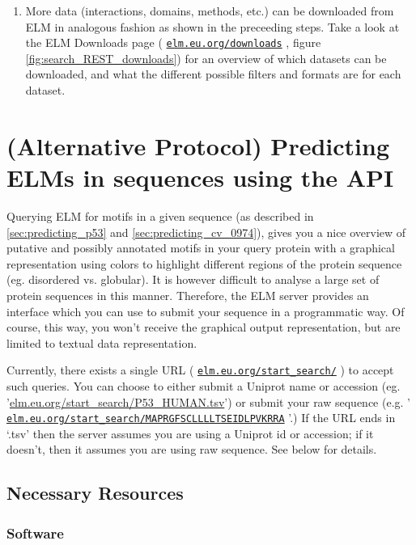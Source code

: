 \documentclass[12pt]{article}
\newcommand\rurl[1]{%
	\href{http://#1}{\nolinkurl{#1}}%
}
\begin{document}
\begin{enumerate}
\item More data (interactions, domains, methods, etc.) can be downloaded from
	ELM in analogous fashion as shown in the preceeding steps. Take a look
	at the ELM Downloads page (\rurl{elm.eu.org/downloads}, figure
	\ref{fig:search_REST_downloads}) for an overview of which datasets can
	be downloaded, and what the different possible filters and formats are
	for each dataset.

\end{enumerate}

\clearpage

\section{(Alternative Protocol) Predicting ELMs in sequences using the API}
\label{sec:predicting_REST}

Querying ELM for motifs in a given sequence (as described in
\ref{sec:predicting_p53} and \ref{sec:predicting_cv_0974}), gives you a nice
overview of putative and possibly
annotated motifs in your query protein with a graphical representation
using colors to highlight different regions of the protein sequence (eg.
disordered vs. globular). It is however difficult to analyse a large set
of protein sequences in this manner. Therefore, the ELM server
provides an interface which you can use to submit your sequence in a
programmatic way. Of course, this way, you won't receive the graphical
output representation, but are limited to textual data representation.

Currently, there exists a single URL (\rurl{elm.eu.org/start\_search/})
to accept such queries. You can choose to either submit a Uniprot name
or accession (eg. '\url{elm.eu.org/start\_search/P53\_HUMAN.tsv}') or
submit your raw sequence (e.g. '\rurl{elm.eu.org/start\_search/MAPRGFSCLLLLTSEIDLPVKRRA}'.)
If the URL ends in `.tsv' then the server assumes you
are using a Uniprot id or accession; if it doesn't, then it assumes you
are using raw sequence. See below for details.

%
%
\subsection*{Necessary Resources}
\subsubsection*{Software}

\end{document}
